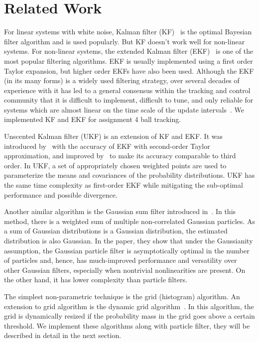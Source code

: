 \section{Related Work}
For linear systems with white noise, Kalman filter (KF)~\cite{kalman,prob} is the optimal Bayesian filter algorithm and is used popularly. But KF doesn't work well for non-linear systems. For non-linear systems, the extended Kalman filter (EKF)~\cite{prob} is one of the most popular filtering algorithms. EKF is usually implemented using a first order Taylor expansion, but higher order EKFs have also been used. Although the EKF (in its many forms) is a widely used filtering strategy, over several decades of experience with it has led to a general consensus within the tracking and control community that it is difficult to implement, difficult to tune, and only reliable for systems which are almost linear on the time scale of the update intervals~\cite{ukf1}. We implemented KF and EKF for assignment 4 ball tracking.

Unscented Kalman filter (UKF) is an extension of KF and EKF. It was introduced by~\cite{ukf1,ukf3} with the accuracy of EKF with second-order Taylor approximation, and improved by~\cite{ukf2} to make its accuracy comparable to third order. In UKF, a set of appropriately chosen weighted points are used to parameterize the means and covariances of the probability distributions. UKF has the same time complexity as first-order EKF while mitigating the sub-optimal performance and possible divergence.

Another aimilar algorithm is the Gaussian sum filter introduced in~\cite{gpf}. In this method, there is a weighted sum of multiple non-correlated Gaussian particles. As a sum of Gaussian distributions is a Gaussian distribution, the estimated distribution is also Gaussian. In the paper, they show that under the Gaussianity assumption, the Gaussian particle filter is asymptotically optimal in the number of particles and, hence, has much-improved performance and versatility over other Gaussian filters, especially when nontrivial nonlinearities are present. On the other hand, it has lower complexity than particle filters.

The simplest non-parametric technique is the grid (histogram) algorithm. An extension to grid algorithm is the dynamic grid algorithm~\cite{grid1,prob}. In this algorithm, the grid is dynamically resized if the probability mass in the grid goes above a certain threshold. We implement these algorithms along with particle filter, they will be described in detail in the next section.

